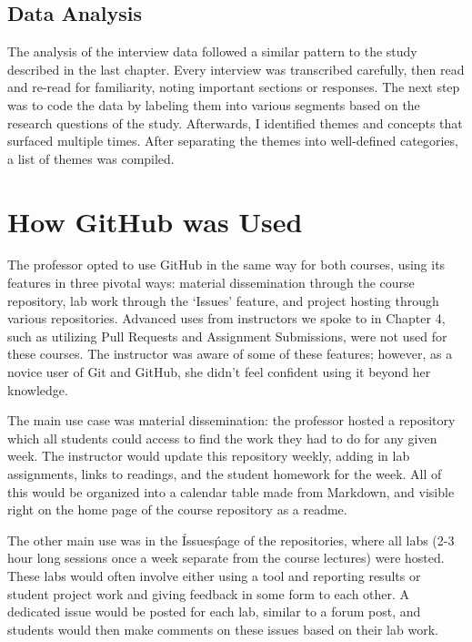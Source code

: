 
\subsection{Data Analysis}
The analysis of the interview data followed a similar pattern to the study described in the last chapter. Every interview was transcribed carefully, then read and re-read for familiarity, noting important sections or responses. The next step was to code the data by labeling them into various segments based on the research questions of the study. Afterwards, I identified themes and concepts that surfaced multiple times. After separating the themes into well-defined categories, a list of themes was compiled.


\section{How GitHub was Used}
The professor opted to use GitHub in the same way for both courses, using its features in three pivotal ways: material dissemination through the course repository, lab work through the `Issues' feature, and project hosting through various repositories. Advanced uses from instructors we spoke to in Chapter 4, such as utilizing Pull Requests and Assignment Submissions, were not used for these courses. The instructor was aware of some of these features; however, as a novice user of Git and GitHub, she didn't feel confident using it beyond her knowledge.

The main use case was material dissemination: the professor hosted a repository which all students could access to find the work they had to do for any given week. The instructor would update this repository weekly, adding in lab assignments, links to readings, and the student homework for the week. All of this would be organized into a calendar table made from Markdown, and visible right on the home page of the course repository as a readme.

The other main use was in the \'Issues\' page of the repositories, where all labs (2-3 hour long sessions once a week separate from the course lectures) were hosted. These labs would often involve either using a tool and reporting results or student project work and giving feedback in some form to each other. A dedicated issue would be posted for each lab, similar to a forum post, and students would then make comments on these issues based on their lab work.

